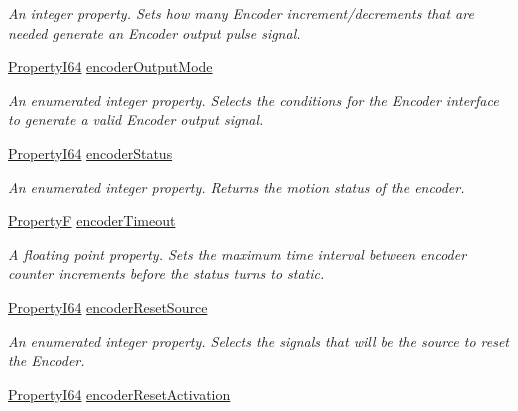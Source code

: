 \begin{DoxyCompactItemize}
\begin{DoxyCompactList}\small\item\em An integer property. Sets how many Encoder increment/decrements that are needed generate an Encoder output pulse signal. \end{DoxyCompactList}\item 
\hyperlink{group___common_interface_ga81749b2696755513663492664a18a893}{Property\+I64} \hyperlink{classmv_i_m_p_a_c_t_1_1acquire_1_1_gen_i_cam_1_1_encoder_control_a7a40405d4f56f2631eaba4f26edca5f5}{encoder\+Output\+Mode}
\begin{DoxyCompactList}\small\item\em An enumerated integer property. Selects the conditions for the Encoder interface to generate a valid Encoder output signal. \end{DoxyCompactList}\item 
\hyperlink{group___common_interface_ga81749b2696755513663492664a18a893}{Property\+I64} \hyperlink{classmv_i_m_p_a_c_t_1_1acquire_1_1_gen_i_cam_1_1_encoder_control_a8708ad7edd51797a09c2b4202faac011}{encoder\+Status}
\begin{DoxyCompactList}\small\item\em An enumerated integer property. Returns the motion status of the encoder. \end{DoxyCompactList}\item 
\hyperlink{group___common_interface_gaf54865fe5a3d5cfd15f9a111b40d09f9}{Property\+F} \hyperlink{classmv_i_m_p_a_c_t_1_1acquire_1_1_gen_i_cam_1_1_encoder_control_a677351d73e21b249dfe42edbd15211a7}{encoder\+Timeout}
\begin{DoxyCompactList}\small\item\em A floating point property. Sets the maximum time interval between encoder counter increments before the status turns to static. \end{DoxyCompactList}\item 
\hyperlink{group___common_interface_ga81749b2696755513663492664a18a893}{Property\+I64} \hyperlink{classmv_i_m_p_a_c_t_1_1acquire_1_1_gen_i_cam_1_1_encoder_control_a31fc18b202aa161011717d6436a910cd}{encoder\+Reset\+Source}
\begin{DoxyCompactList}\small\item\em An enumerated integer property. Selects the signals that will be the source to reset the Encoder. \end{DoxyCompactList}\item 
\hyperlink{group___common_interface_ga81749b2696755513663492664a18a893}{Property\+I64} \hyperlink{classmv_i_m_p_a_c_t_1_1acquire_1_1_gen_i_cam_1_1_encoder_control_a4368e6fc149c01b706f2e89d522c1a4a}{encoder\+Reset\+Activation}

\end{DoxyCompactItemize}
